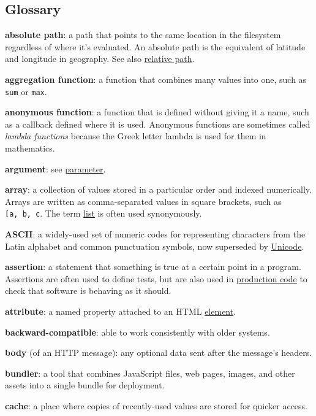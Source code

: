 \subsection{Glossary}\label{s:gloss}

\textbf{absolute path}: a path that points to the same location in the
filesystem regardless of where it's evaluated. An absolute path is the
equivalent of latitude and longitude in geography. See also
\protect\hyperlink{g:relative-path}{relative path}.

\textbf{aggregation function}: a function that combines many values into
one, such as \texttt{sum} or \texttt{max}.

\textbf{anonymous function}: a function that is defined without giving
it a name, such as a callback defined where it is used. Anonymous
functions are sometimes called \emph{lambda functions} because the Greek
letter lambda is used for them in mathematics.

\textbf{argument}: see \protect\hyperlink{g:parameter}{parameter}.

\textbf{array}: a collection of values stored in a particular order and
indexed numerically. Arrays are written as comma-separated values in
square brackets, such as
\texttt{{[}\textquotesingle{}a\textquotesingle{},\ \textquotesingle{}b\textquotesingle{},\ \textquotesingle{}c\textquotesingle{}{]}}.
The term \protect\hyperlink{g:list}{list} is often used synonymously.

\textbf{ASCII}: a widely-used set of numeric codes for representing
characters from the Latin alphabet and common punctuation symbols, now
superseded by \protect\hyperlink{g:unicode}{Unicode}.

\textbf{assertion}: a statement that something is true at a certain
point in a program. Assertions are often used to define tests, but are
also used in \protect\hyperlink{g:production-code}{production code} to
check that software is behaving as it should.

\textbf{attribute}: a named property attached to an HTML
\protect\hyperlink{g:element}{element}.

\textbf{backward-compatible}: able to work consistently with older
systems.

\textbf{body} (of an HTTP message): any optional data sent after the
message's headers.

\textbf{bundler}: a tool that combines JavaScript files, web pages,
images, and other assets into a single bundle for deployment.

\textbf{cache}: a place where copies of recently-used values are stored
for quicker access.

